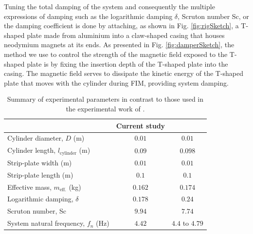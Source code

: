\documentclass[oneside]{utmthesis}
\begin{document}
Tuning the total damping of the system and consequently the multiple expressions of damping such as the logarithmic damping $\delta$, Scruton number Sc, or the damping coefficient is done by attaching, as shown in Fig. \ref{fig:rigSketch}, a T-shaped plate made from aluminium into a claw-shaped casing that houses neodymium magnets at its ends. As presented in Fig. \ref{fig:damperSketch}, the method we use to control the strength of the magnetic field exposed to the T-shaped plate is by fixing the insertion depth of the T-shaped plate into the casing. The magnetic field serves to dissipate the kinetic energy of the T-shaped plate that moves with the cylinder during FIM, providing system damping.

\begin{table}[!ht]
\centering
\caption{Summary of experimental parameters in contrast to those used in the experimental work of \citet{Koide2013}.} \label{tab:expParameter}
\vspace{\baselineskip}
\begin{tabular}{l c c}
  \hline
  \hline
                                           & Current study & \citet{Koide2013}\\
  \hline
Cylinder diameter, $D$ (m)                 & $0.01$        & $0.01$           \\
Cylinder length, $l_{\text{cylinder}}$ (m) & $0.09$        & $0.098$          \\
Strip-plate width (m)                      & $0.01$        & $0.01$           \\
Strip-plate length (m)                     & $0.1$         & $0.1$            \\
Effective mass, $m_{\text{eff.}}$ (kg)     & $0.162$       & $0.174$          \\
Logarithmic damping, $\delta$              & $0.178$       & $0.24$           \\
Scruton number, Sc                         & $9.94$        & $7.74$           \\
System natural frequency, $f_{n}$ (Hz)     & $4.42$        & $4.4$ to $4.79$  \\
  \hline
  \hline
\end{tabular}
\end{table}
\end{document}
